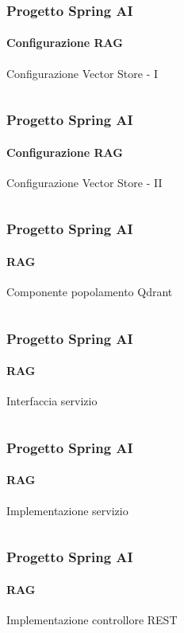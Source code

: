 %
\begin{frame}[t,fragile] \frametitle{Progetto Spring AI}
    \framesubtitle{Configurazione RAG}
        \vspace*{-.7cm}
        \begin{block}{Configurazione Vector Store - I}
			{\tiny\inputminted{java}{code/RAGConfig.java}}
    	\end{block}
\end{frame}
%
\begin{frame}[t,fragile] \frametitle{Progetto Spring AI}
    \framesubtitle{Configurazione RAG}
        \vspace*{-.7cm}
        \begin{block}{Configurazione Vector Store - II}
			{\tiny\inputminted{java}{code/RAGConfig-2.java}}
    	\end{block}
\end{frame}
%
\begin{frame}[t,fragile] \frametitle{Progetto Spring AI}
    \framesubtitle{RAG}
        \begin{block}{Componente popolamento Qdrant}
			{\tiny\inputminted{java}{code/TextDataLoader.java}}
    	\end{block}
\end{frame}
%
\begin{frame}[t,fragile] \frametitle{Progetto Spring AI}
    \framesubtitle{RAG}
        \begin{block}{Interfaccia servizio}
			{\tiny\inputminted{java}{code/RAGService.java}}
    	\end{block}
\end{frame}
%
\begin{frame}[t,fragile] \frametitle{Progetto Spring AI}
    \framesubtitle{RAG}
        \vspace*{-.7cm}
        \begin{block}{Implementazione servizio}
			{\tiny\inputminted{java}{code/RAGServiceImpl.java}}
    	\end{block}
\end{frame}
%
\begin{frame}[t,fragile] \frametitle{Progetto Spring AI}
    \framesubtitle{RAG}
    	\vspace*{-.7cm}
        \begin{block}{Implementazione controllore REST}
			{\tiny\inputminted{java}{code/QuestionController.java}}
    	\end{block}
\end{frame}
%
